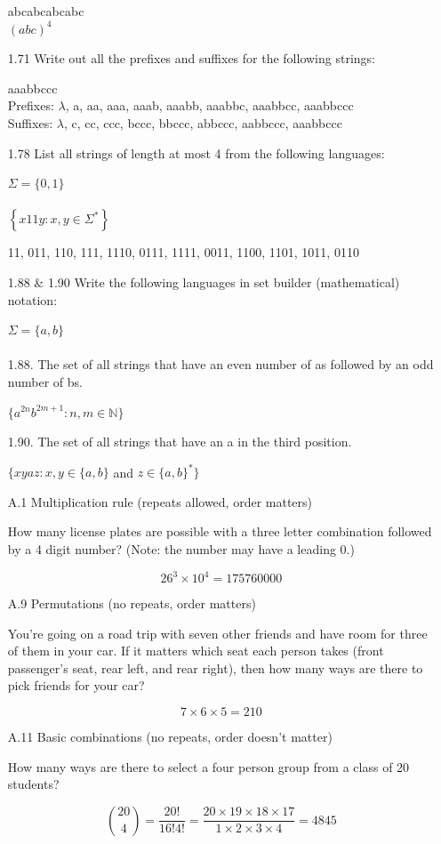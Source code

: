 \documentclass[10pt]{article}
\begin{document}
\begin{enumerate}
            abcabcabcabc
            \\$(abc)^4$

      \item [1.71] Write out all the prefixes and suffixes for the following strings:

            aaabbccc
            \\ Prefixes: $\lambda$, a, aa, aaa, aaab, aaabb, aaabbc, aaabbcc, aaabbccc
            \\ Suffixes: $\lambda$, c, cc, ccc, bccc, bbccc, abbccc, aabbccc, aaabbccc

      \item [1.78] List all strings of length at most 4 from the following languages:

            $\Sigma = \{0, 1\}$
            \\
            \\$\left\{x 11 y: x, y \in \Sigma^*\right\}$

            11, 011, 110, 111, 1110, 0111, 1111, 0011, 1100, 1101, 1011, 0110

      \item [1.88 \& 1.90] Write the following languages in set builder (mathematical) notation:

            $\Sigma = \{a, b\}$
            \\
            \\1.88. The set of all strings that have an even number of as followed by an odd number of bs.

            $\{a^{2n}b^{2m+1} : n,m\in \mathbb{N} \}$


            1.90. The set of all strings that have an a in the third position.

            $\{xyaz : x, y \in \{a, b\}$ and $z \in \{a,b\}^{*} \}$


      \item [A.1] Multiplication rule (repeats allowed, order matters)

            How many license plates are possible with a three letter combination followed by a 4 digit number? (Note: the number may have a leading 0.)

            $$26^3 \times 10^4 = 175760000$$

      \item [A.9] Permutations (no repeats, order matters)

            You’re going on a road trip with seven other friends and have room for three of them in your car. If it matters which seat each person takes (front passenger’s seat, rear left, and rear right), then how many ways are there to pick friends for your car?

            $$7 \times 6 \times 5 = 210$$

      \item [A.11] Basic combinations (no repeats, order doesn’t matter)

            How many ways are there to select a four person group from a class of 20 students?

            $$\binom{20}{4}=\frac{20!}{16!4!}=\frac{20 \times 19 \times 18 \times 17}{1 \times 2 \times 3 \times 4}=4845$$


\end{enumerate}
\end{document}
